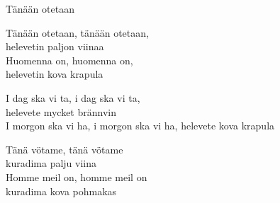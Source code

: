 \begin{song}{Tänään otetaan}


    Tänään otetaan, tänään otetaan,\\
    helevetin paljon viinaa\\
    Huomenna on, huomenna on,\\
    helevetin kova krapula

    I dag ska vi ta, i dag ska vi ta,\\
    helevete mycket brännvin\\
    I morgon ska vi ha, i morgon ska vi ha, helevete kova krapula

    Tänä vötame, tänä vötame\\
    kuradima palju viina\\
    Homme meil on, homme meil on\\
    kuradima kova pohmakas

\end{song}
